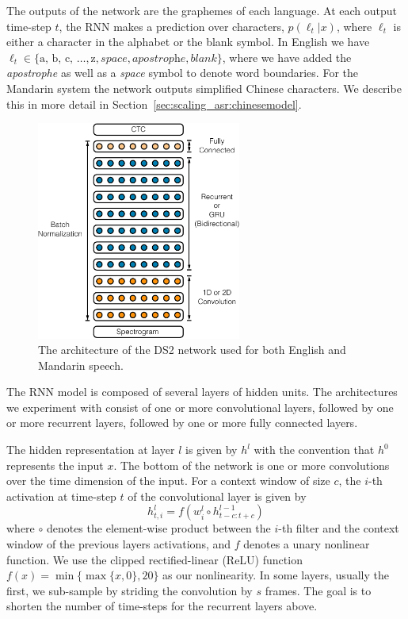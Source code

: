 The outputs of the network are the graphemes of each language. At each output
time-step $t$, the RNN makes a prediction over characters, $p(\ell_t | x)$,
where $\ell_t$ is either a character in the alphabet or the blank symbol. In
English we have $\ell_t \in \{\textrm{a, b, c, }\ldots, \textrm{z},
\textit{space}, \textit{apostrophe}, \textit{blank}\}$, where we have added the
\textit{apostrophe} as well as a \textit{space} symbol to denote word
boundaries. For the Mandarin system the network outputs simplified Chinese
characters.  We describe this in more detail in
Section~\ref{sec:scaling_asr:chinesemodel}.

\begin{figure}
    \centering
    \includegraphics[width=0.6\textwidth]{scaling_asr/figures/ds2_architecture.pdf}
    \caption{The architecture of the DS2 network used for both English and
             Mandarin speech.}
    \label{fig:scaling_asr:ds2_network}
\end{figure}

The RNN model is composed of several layers of hidden units. The architectures
we experiment with consist of one or more convolutional layers, followed by one
or more recurrent layers, followed by one or more fully connected layers.

The hidden representation at layer $l$ is given by $h^l$ with the convention
that $h^0$ represents the input $x$. The bottom of the network is one or more
convolutions over the time dimension of the input. For a context window of size
$c$, the $i$-th activation at time-step $t$ of the convolutional layer is given
by
\begin{equation*}
h_{t,i}^l = f( w_i^l \circ h^{l-1}_{t-c:t+c} )
\end{equation*}
where $\circ$ denotes the element-wise product between the $i$-th filter and
the context window of the previous layers activations, and $f$ denotes a unary
nonlinear function. We use the clipped rectified-linear (ReLU) function $f(x) =
\min\{\max\{x, 0\},20\}$ as our nonlinearity. In some layers, usually the
first, we sub-sample by striding the convolution by $s$ frames. The goal is to
shorten the number of time-steps for the recurrent layers above.

